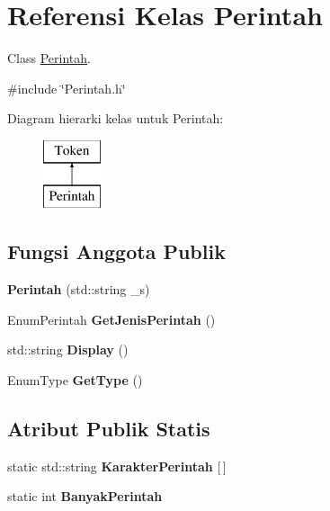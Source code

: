\hypertarget{classPerintah}{}\section{Referensi Kelas Perintah}
\label{classPerintah}


Class \hyperlink{classPerintah}{Perintah}.  




{\ttfamily \#include \char`\"{}Perintah.\+h\char`\"{}}

Diagram hierarki kelas untuk Perintah\+:\begin{figure}[H]
\begin{center}
\leavevmode
\includegraphics[height=2.000000cm]{d9/de7/classPerintah}
\end{center}
\end{figure}
\subsection*{Fungsi Anggota Publik}
\begin{DoxyCompactItemize}
\item 
\hypertarget{classPerintah_a653750ef3a98a12a11b3bfb6285484c2}{}{\bfseries Perintah} (std\+::string \+\_\+s)\label{classPerintah_a653750ef3a98a12a11b3bfb6285484c2}

\item 
\hypertarget{classPerintah_aef16391fc67acc7ff74354db10eaa92a}{}Enum\+Perintah {\bfseries Get\+Jenis\+Perintah} ()\label{classPerintah_aef16391fc67acc7ff74354db10eaa92a}

\item 
\hypertarget{classPerintah_a32e0674e117dea6e1b69ea66ed885ea1}{}std\+::string {\bfseries Display} ()\label{classPerintah_a32e0674e117dea6e1b69ea66ed885ea1}

\item 
\hypertarget{classPerintah_ad2e51be1b5d590c538be4eeaecd9b110}{}Enum\+Type {\bfseries Get\+Type} ()\label{classPerintah_ad2e51be1b5d590c538be4eeaecd9b110}

\end{DoxyCompactItemize}
\subsection*{Atribut Publik Statis}
\begin{DoxyCompactItemize}
\item 
\hypertarget{classPerintah_ad52acf87f08dae5f2756e80597a925e5}{}static std\+::string {\bfseries Karakter\+Perintah} \mbox{[}$\,$\mbox{]}\label{classPerintah_ad52acf87f08dae5f2756e80597a925e5}

\item 
\hypertarget{classPerintah_afb3b32fca72ced1dd39c9083d65f721e}{}static int {\bfseries Banyak\+Perintah}\label{classPerintah_afb3b32fca72ced1dd39c9083d65f721e}

\end{DoxyCompactItemize}


